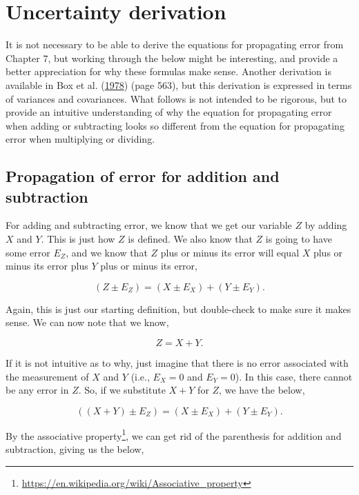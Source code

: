 \documentclass[
  openany]{krantz}
\renewcommand{\href}[2]{#2\footnote{\url{#1}}}
\begin{document}
\hypertarget{uncertainty_derivation}{%
\chapter{Uncertainty derivation}\label{uncertainty_derivation}}

It is not necessary to be able to derive the equations for propagating error from Chapter 7, but working through the below might be interesting, and provide a better appreciation for why these formulas make sense.
Another derivation is available in Box et al. (\protect\hyperlink{ref-Box1978}{1978}) (page 563), but this derivation is expressed in terms of variances and covariances.
What follows is not intended to be rigorous, but to provide an intuitive understanding of why the equation for propagating error when adding or subtracting looks so different from the equation for propagating error when multiplying or dividing.

\hypertarget{propagation-of-error-for-addition-and-subtraction}{%
\section{Propagation of error for addition and subtraction}\label{propagation-of-error-for-addition-and-subtraction}}

For adding and subtracting error, we know that we get our variable \(Z\) by adding \(X\) and \(Y\). This is just how \(Z\) is defined. We also know that \(Z\) is going to have some error \(E_Z\), and we know that \(Z\) plus or minus its error will equal \(X\) plus or minus its error plus \(Y\) plus or minus its error,

\[(Z \pm E_Z) = (X  \pm E_X) + (Y \pm E_Y).\]

Again, this is just our starting definition, but double-check to make sure it makes sense. We can now note that we know,

\[Z =X+Y.\]

If it is not intuitive as to why, just imagine that there is no error associated with the measurement of \(X\) and \(Y\) (i.e., \(E_{X} = 0\) and \(E_{Y} = 0\)).
In this case, there cannot be any error in \(Z\). So, if we substitute \(X + Y\) for \(Z\), we have the below,

\[((X + Y) \pm E_Z) = (X  \pm E_X) + (Y \pm E_Y).\]

By the \href{https://en.wikipedia.org/wiki/Associative_property}{associative property}, we can get rid of the parenthesis for addition and subtraction, giving us the below,
\end{document}
